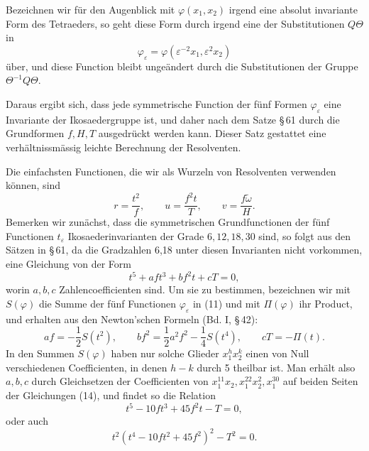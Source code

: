 \documentclass[11pt]{article}
\providecommand{\eps}{\varepsilon}
\providecommand{\eps}{\varepsilon}
\begin{document}
Bezeichnen wir für den Augenblick mit \(\varphi(x_1,x_2)\) irgend eine absolut invariante Form des Tetraeders, so geht diese Form durch irgend eine der Substitutionen \(Q\Theta\) in
\begin{equation}
\varphi_\eps=\varphi(\eps^{-2}x_1,\eps^2x_2)
\tag{11}
\end{equation}
über, und diese Function bleibt ungeändert durch die Substitutionen der Gruppe \(\Theta^{-1}Q\Theta\).

Daraus ergibt sich, dass jede symmetrische Function der fünf Formen \(\varphi_\eps\) eine Invariante der Ikosaedergruppe ist, und daher nach dem Satze \S\,61 durch die Grundformen \(f,H,T\) ausgedrückt werden kann. Dieser Satz gestattet eine verhältnissmässig leichte Berechnung der Resolventen.

Die einfachsten Functionen, die wir als Wurzeln von Resolventen verwenden können, sind
\begin{equation}
r=\frac{t^2}{f},
\qquad
u=\frac{f^2t}{T},
\qquad
v=\frac{f\tilde\omega}{H}.
\tag{12}
\end{equation}
Bemerken wir zunächst, dass die symmetrischen Grundfunctionen der fünf Functionen \(t_\eps\) Ikosaederinvarianten der Grade \(6,12,18,30\) sind, so folgt aus den Sätzen in \S\,61, da die Gradzahlen 6,18 unter diesen Invarianten nicht vorkommen, eine Gleichung von der Form
\begin{equation}
t^5+aft^3+bf^2t+cT=0,
\tag{13}
\end{equation}
worin \(a,b,c\) Zahlencoefficienten sind. Um sie zu bestimmen, bezeichnen wir mit \(S(\varphi)\) die Summe der fünf Functionen \(\varphi_\eps\) in (11) und mit \(\Pi(\varphi)\) ihr Product, und erhalten aus den Newton'schen Formeln (Bd. I, \S\,42):
\begin{equation}
af=-\frac12S(t^2),\qquad bf^2=\frac12a^2f^2-\frac14S(t^4),\qquad cT=-\Pi(t).
\tag{14}
\end{equation}
In den Summen \(S(\varphi)\) haben nur solche Glieder \(x_1^hx_2^k\) einen von Null verschiedenen Coefficienten, in denen \(h-k\) durch 5 theilbar ist. Man erhält also \(a,b,c\) durch Gleichsetzen der Coefficienten von \(x_1^{11}x_2,x_1^{22}x_2^2,x_1^{30}\) auf beiden Seiten der Gleichungen (14), und findet so die Relation
\begin{equation}
t^5-10ft^3+45f^2t-T=0,
\tag{15}
\end{equation}
oder auch
\begin{equation}
t^2(t^4-10ft^2+45f^2)^2-T^2=0.
\tag{16}
\end{equation}
\end{document}
